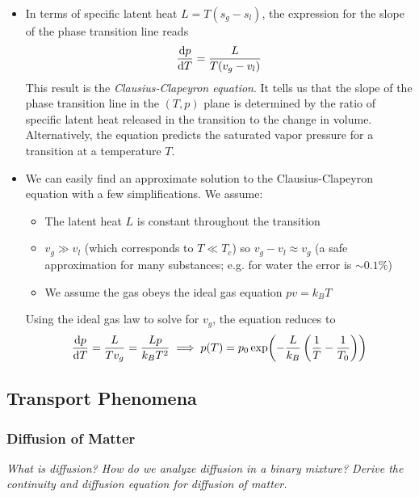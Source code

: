 \documentclass[11pt, a4paper]{article}
\begin{document}
\begin{itemize}
	\item In terms of specific latent heat $ L = T(s_{g} - s_{l}) $, the expression for the slope of the phase transition line reads
	\begin{equation*}
		\dv{p}{T} = \frac{L}{T(v_{g} - v_{l})}
	\end{equation*}
	This result is the \textit{Clausius-Clapeyron equation}. It tells us that the slope of the phase transition line in the $ (T, p) $ plane is determined by the ratio of specific latent heat released in the transition to the change in volume. Alternatively, the equation predicts the saturated vapor pressure for a transition at a temperature $ T $.
	
	\item We can easily find an approximate solution to the Clausius-Clapeyron equation with a few simplifications. We assume:
	\begin{itemize}
		\item The latent heat $ L $ is constant throughout the transition
		\item $ v_{g} \gg v_{l} $ (which corresponds to $ T \ll T_{c} $) so $ v_{g} - v_{l} \approx v_{g}$ (a safe approximation for many substances; e.g. for water the error is $ \sim 0.1 \% $)
		\item We assume the gas obeys the ideal gas equation $ pv = k_{B}T $
	\end{itemize}
	Using the ideal gas law to solve for $ v_{g} $, the equation reduces to
	\begin{equation*}
		\dv{p}{T} = \frac{L}{Tv_{g}} = \frac{Lp}{k_{B}T^{2}} \implies p(T) = p_{0} \exp(-\frac{L}{k_{B}}\left(\frac{1}{T}-\frac{1}{T_{0}}\right))
	\end{equation*}
\end{itemize}



\subsection{Transport Phenomena}

\subsubsection{Diffusion of Matter}
\textit{What is diffusion? How do we analyze diffusion in a binary mixture? Derive the continuity and diffusion equation for diffusion of matter.} 
\end{document}
